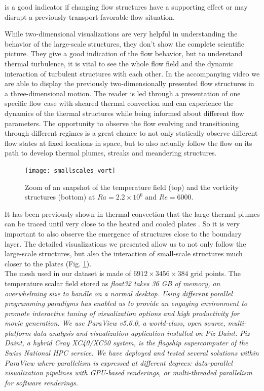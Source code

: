 \documentclass[5p,times]{elsarticle}
\begin{document}
is a good indicator if changing flow structures have a supporting effect or may disrupt a previously transport-favorable flow situation. 

While two-dimensional visualizations are very helpful in understanding the behavior of the large-scale structures, they don't show the complete scientific picture. They give a good indication of the flow behavior, but to understand thermal turbulence, it is vital to see the whole flow field and the dynamic interaction of turbulent structures with each other.
In the accompanying video we are able to display the previously two-dimensionally presented flow structures in a three-dimensional motion. The reader is led through a presentation of one specific flow case with sheared thermal convection and can experience the dynamics of the thermal structures while being informed about different flow parameters. The opportunity to observe the flow evolving and transitioning through different regimes is a great chance to not only statically observe different flow states at fixed locations in space, but to also actually follow the flow on its path to develop thermal plumes, streaks and meandering structures.


\begin{figure}
	\centering
	\texttt{[image: smallscales\_vort]}%
	\caption{\label{fig:smallscale} Zoom of an snapshot of the temperature field (top) and the vorticity structures (bottom) at $ Ra=2.2 \times 10^6 $ and $ Re=6000 $.}
\end{figure}

It has been previously shown in thermal convection that the large thermal plumes can be traced until very close to the heated and cooled plates \cite{ste18}. So it is very important to also observe the emergence of structures close to the boundary layer. The detailed visualizations we presented allow us to not only follow the large-scale structures, but also the interaction of small-scale structures much closer to the plates (Fig. \ref{fig:smallscale}).\\

The mesh used in our dataset is made of $ 6912 \times 3456 \times 384 $ grid points.
The temperature scalar field stored as \it{float32} \rm takes 36 GB of memory, an
overwhelming size to handle on a normal desktop. Using different parallel programming
paradigms has enabled us to provide an engaging environment
to promote interactive tuning of visualization options and high productivity for movie
generation. We use ParaView v5.6.0, a world-class, open source, multi-platform data analysis and
visualization application installed on Piz Daint. Piz Daint, a hybrid Cray XC40/XC50 system,
is the flagship supercomputer of the Swiss National HPC service. We have deployed
and tested several solutions within ParaView where parallelism is expressed
at different degrees: data-parallel visualization pipelines with GPU-based renderings,
or multi-threaded parallelism for software renderings.
\end{document}
